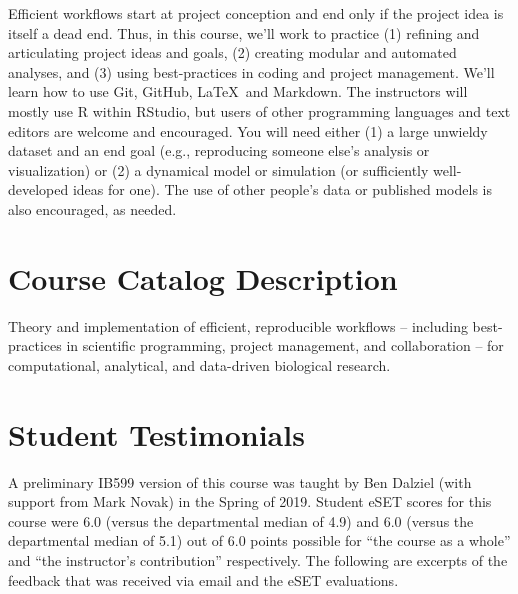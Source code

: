 \documentclass[10pt]{article}
\begin{document}
Efficient workflows start at project conception and end only if the project idea is itself a dead end.  Thus, in this course, we'll work to practice (1) refining and articulating project ideas and goals, (2) creating modular and automated analyses, and (3) using best-practices in coding and project management. We'll learn how to use Git, GitHub, \LaTeX\, and Markdown.  The instructors will mostly use \textsf{R} within RStudio, but users of other programming languages and text editors are welcome and encouraged.  You will need either (1) a large unwieldy dataset and an end goal (e.g., reproducing someone else's analysis or visualization) or (2) a dynamical model or simulation (or sufficiently well-developed ideas for one).  The use of other people's data or published models is also encouraged, as needed.

\section*{Course Catalog Description}
Theory and implementation of efficient, reproducible workflows -- including best-practices in scientific programming, project management, and collaboration --  for computational, analytical, and data-driven biological research.

\section*{Student Testimonials}
A preliminary IB599 version of this course was taught by Ben Dalziel (with support from Mark Novak) in the Spring of 2019.  Student eSET scores for this course were 6.0 (versus the departmental median of 4.9) and 6.0 (versus the departmental median of 5.1) out of 6.0 points possible for ``the course as a whole'' and ``the instructor's contribution'' respectively. The following are excerpts of the feedback that was received via email and the eSET evaluations.
\end{document}
